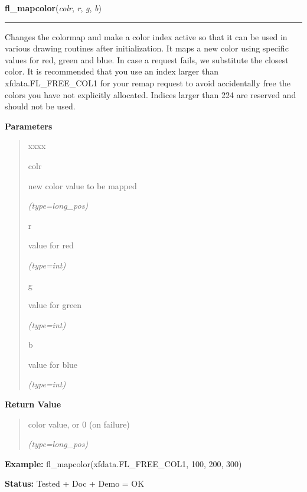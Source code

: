 \hspace{.8\funcindent}\begin{boxedminipage}{\funcwidth}

    \raggedright \textbf{fl\_mapcolor}(\textit{colr}, \textit{r}, \textit{g}, \textit{b})

    \vspace{-1.5ex}

    \rule{\textwidth}{0.5\fboxrule}
\setlength{\parskip}{2ex}
    Changes the colormap and make a color index active so that it can be 
    used in various drawing routines after initialization. It maps a new 
    color using specific values for red, green and blue. In case a request 
    fails, we substitute the closest color. It is recommended that you use 
    an index larger than xfdata.FL\_FREE\_COL1 for your remap request to 
    avoid accidentally free the colors you have not explicitly allocated. 
    Indices larger than 224 are reserved and should not be used.

\setlength{\parskip}{1ex}
      \textbf{Parameters}
      \vspace{-1ex}

      \begin{quote}
        \begin{Ventry}{xxxx}

          \item[colr]

          new color value to be mapped

            {\it (type=long\_pos)}

          \item[r]

          value for red

            {\it (type=int)}

          \item[g]

          value for green

            {\it (type=int)}

          \item[b]

          value for blue

            {\it (type=int)}

        \end{Ventry}

      \end{quote}

      \textbf{Return Value}
    \vspace{-1ex}

      \begin{quote}
      color value, or 0 (on failure)

      {\it (type=long\_pos)}

      \end{quote}

\textbf{Example:} fl\_mapcolor(xfdata.FL\_FREE\_COL1, 100, 200, 300)



\textbf{Status:} Tested + Doc + Demo = OK



    \end{boxedminipage}

